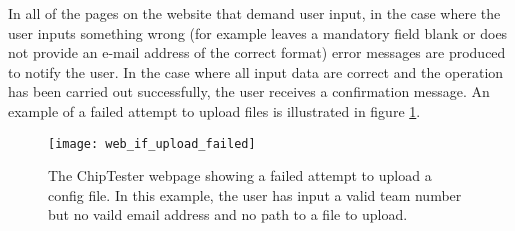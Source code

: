 In all of the pages on the website that demand user input, in the case where the user inputs something wrong (for example leaves a mandatory field blank or does not provide an e-mail address of the correct format) error messages are produced to notify the user. In the case where all input data are correct and the operation has been carried out successfully, the user receives a confirmation message. An example of a failed attempt to upload files is illustrated in figure \ref{fig:web_if_upload_failed}.

\begin{figure}[ht]
 \centering
 \texttt{[image: web\_if\_upload\_failed]}
 \caption{The ChipTester webpage showing a failed attempt to upload a config file. In this example, the user has input a valid team number but no vaild email address and no path to a file to upload.}
 \label{fig:web_if_upload_failed}
\end{figure}


